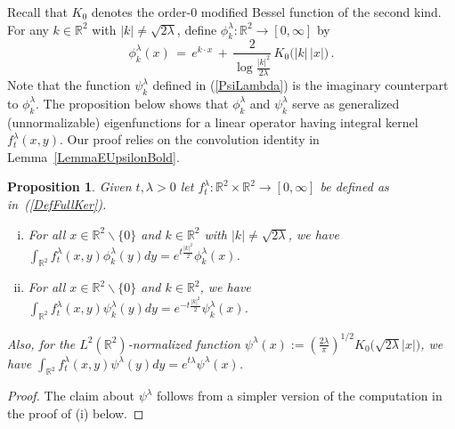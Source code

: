 \documentclass[10pt]{article}
\numberwithin{equation}{section}
\newtheorem{proposition}[theorem]{Proposition}
\theoremstyle{definition}
\newcommand{\R}{{\mathbb R}}
\begin{document}
\begin{appendix}
Recall that $K_0$ denotes the order-$0$ modified Bessel function of the second kind. For any  $ k\in \R^2$ with $|k|\neq \sqrt{2\lambda}$, define $\phi^{\lambda}_k:\R^2\rightarrow [0,\infty]$ by
$$  \phi^{\lambda}_k(x)\,=\, e^{k\cdot x}\,+\,\frac{ 2  }{\log \frac{|k|^2}{2\lambda}   }\, K_0\big(|k|\,|x|\big) \,. $$
Note that the function $\psi^{\lambda}_k$ defined in (\ref{PsiLambda}) is the imaginary counterpart to $\phi^{\lambda}_k$.  The proposition below shows that $\phi^{\lambda}_k$ and $\psi^{\lambda}_k$  serve as generalized (unnormalizable)  eigenfunctions for a linear operator having  integral kernel $f_t^{\lambda}(x,y)$.  Our proof relies on the convolution identity  in Lemma~\ref{LemmaEUpsilonBold}.
\begin{proposition}\label{PropRealUnnormEigen} Given $t,\lambda>0$ let  $f_t^{\lambda}:\R^2\times \R^2\rightarrow [0,\infty] $ be defined as in~(\ref{DefFullKer}).
\begin{enumerate}[(i)]
    \item For all  $x\in \R^2\backslash \{0\}$ and  $k\in \R^2$ with $|k|\neq \sqrt{2\lambda}$, we have $
\int_{\R^2} f^{\lambda}_t(x,y)\phi^{\lambda}_k(y)dy =e^{t\frac{|k|^2}{2} }\phi^{\lambda}_k(x) $. 
    
    \item For all  $x\in \R^2\backslash \{0\}$ and  $k\in \R^2$, we have $\int_{\R^2} f^{\lambda}_t(x,y)\psi^{\lambda}_k(y)dy =e^{-t\frac{|k|^2}{2} }\psi^{\lambda}_k(x)$.



    
\end{enumerate}
Also, for the $L^2(\R^2)$-normalized function $\psi^{\lambda}(x):= (\frac{ 2\lambda }{\pi  })^{1/2}K_0\big(\sqrt{2\lambda}  |x|\big)$, we have  $
\int_{\R^2} f^{\lambda}_t(x,y)\psi^{\lambda}(y)dy =e^{t\lambda }\psi^{\lambda}(x) $. 
\end{proposition}






\begin{proof} The claim about $\psi^{\lambda}$ follows from a simpler version of the computation in the proof of (i) below. \vspace{.1cm}


\end{proof}
\end{appendix}
\end{document}
